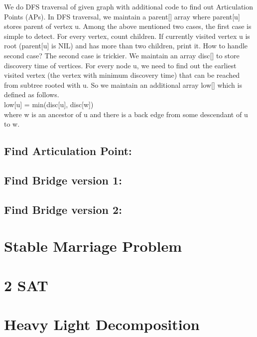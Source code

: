 \documentclass[11pt]{report}
\begin{document}
We do DFS traversal of given graph with additional code to find out Articulation Points (APs). In DFS traversal, we maintain a parent[] array where parent[u] stores parent of vertex u. Among the above mentioned two cases, the first case is simple to detect. For every vertex, count children. If currently visited vertex u is root (parent[u] is NIL) and has more than two children, print it.
How to handle second case? The second case is trickier. We maintain an array disc[] to store discovery time of vertices. For every node u, we need to find out the earliest visited vertex (the vertex with minimum discovery time) that can be reached from subtree rooted with u. So we maintain an additional array low[] which is defined as follows.\\
low[u] = min(disc[u], disc[w]) \\
where w is an ancestor of u and there is a back edge from 
some descendant of u to w.
\subsection{Find Articulation Point:}

\subsection{Find Bridge version 1:}

\subsection{Find Bridge version 2:}

\newpage
\section{Stable Marriage Problem}

\section{2 SAT}

\section{Heavy Light Decomposition}

\end{document}
